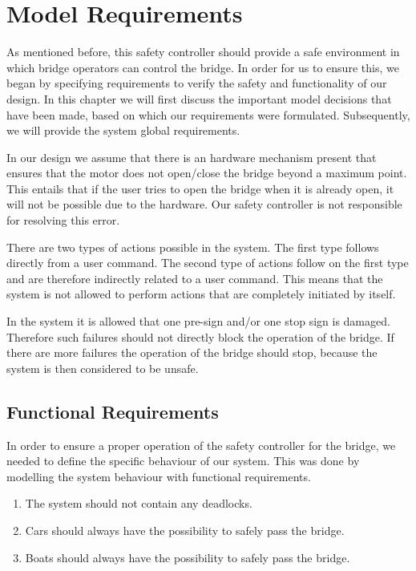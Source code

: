 \chapter{Model Requirements}\label{chap:requirements}
	As mentioned before, this safety controller should provide a safe environment in which bridge operators can control the bridge. 
	In order for us to ensure this, we began by specifying requirements to verify the safety and functionality of our design. 
	In this chapter we will first discuss the important model decisions that have been made, based on which our requirements were formulated. 
	Subsequently, we will provide the system global requirements. 
	  
	In our design we assume that there is an hardware mechanism present that ensures that the motor does not open/close the bridge beyond a maximum point. 
	This entails that if the user tries to open the bridge when it is already open, it will not be possible due to the hardware.
	Our safety controller is not responsible for resolving this error.
	
	There are two types of actions possible in the system. 
	The first type follows directly from a user command. 
	The second type of actions follow on the first type and are therefore indirectly related to a user command. 
	This means that the system is not allowed to perform actions that are completely initiated by itself.
	
	In the system it is allowed that one pre-sign and/or one stop sign is damaged. 
	Therefore such failures should not directly block the operation of the bridge. 
	If there are more failures the operation of the bridge should stop, because the system is then considered to be unsafe.


	\section{Functional Requirements}
		In order to ensure a proper operation of the safety controller for the bridge, we needed to define the specific behaviour of our system. 
		This was done by modelling the system behaviour with functional requirements.  
	 	
	 	
	 	 
		\begin{enumerate}
			\item The system should not contain any deadlocks.
			
			\item Cars should always have the possibility to safely pass the bridge.
			
			\item Boats should always have the possibility to safely pass the bridge.
		\end{enumerate}
	
